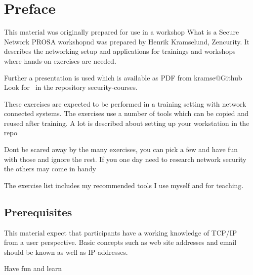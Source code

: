 \documentclass[a4paper,11pt,notitlepage]{report}
\begin{document}
\rm
{}
\newcommand{\subject}[1]{What is a Secure Network PROSA workshop}

\setcounter{tocdepth}{0}

{\color{titlecolor}
\renewcommand{\baselinestretch}{0.3}\setlength{\parskip}{1mm}
\tableofcontents}

\normal
\pagestyle{fancyplain}
\chapter*{\color{titlecolor}Preface}

This material was originally prepared for use in a workshop
\subject and was prepared by
Henrik Kramselund, Zencurity.
It describes the networking setup and
applications for trainings and workshops where hands-on exercises are needed.

Further a presentation is used which is available as PDF from kramse@Github\\
Look for \jobname\ in the repository security-courses.

These exercises are expected to be performed in a training setting with network connected systems. The exercises use a number of tools which can be copied and reused after training. A lot is described about setting up your workstation in the repo


Dont be scared away by the many exercises, you can pick a few and have fun with those and ignore the rest. If you one day need to research network security the others may come in handy \smiley

The exercise list includes my recommended tools I use myself and for teaching.

\section*{\color{titlecolor}Prerequisites}

This material expect that participants have a working knowledge of
TCP/IP from a user perspective. Basic concepts such as web site addresses and email should be known as well as IP-addresses.


\vskip 1cm
Have fun and learn

\eject

\rhead{\fancyplain{}{\bf \chaptername\ \thechapter}}
\end{document}
